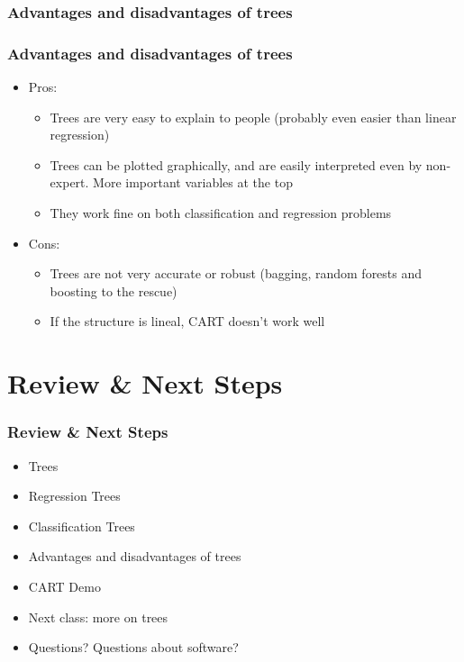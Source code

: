 \documentclass[
  shownotes,
  xcolor={svgnames},
  hyperref={colorlinks,citecolor=DarkBlue,linkcolor=DarkRed,urlcolor=DarkBlue}
  , aspectratio=169]{beamer}
\begin{document}
\subsubsection{Advantages and disadvantages of trees}
\begin{frame}[fragile]
\frametitle{Advantages and disadvantages of trees}

\begin{itemize}
\item Pros: 
  \begin{itemize}
    \item Trees are very easy to explain to people (probably even easier than linear regression)
    \medskip
    \item Trees can be plotted graphically, and are easily interpreted even by non-expert. More important variables at the top
    \medskip
    \item They work fine on both classification and regression problems
  \end{itemize}

\bigskip
\item  Cons:
  \begin{itemize}
    \item Trees are not very accurate or robust (bagging, random forests and boosting to the rescue)
    \medskip
    \item If the structure is lineal, CART doesn't work well
  \end{itemize}
\end{itemize}

\end{frame}
\section{Review \& Next Steps}
\begin{frame}
\frametitle{Review \& Next Steps}

\begin{itemize} 
    \item Trees
    \item Regression Trees
    \item Classification Trees
    \item  Advantages and disadvantages of trees
    \item  CART Demo

    \bigskip  
  \item  Next class:  more on trees


\bigskip  
\item Questions? Questions about software? 

\end{itemize}
\end{frame}
\end{document}
